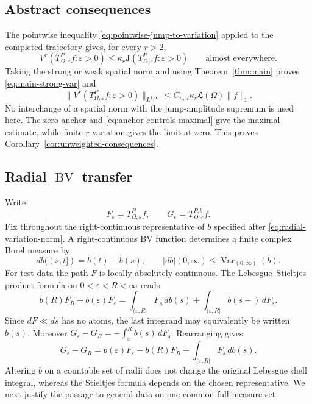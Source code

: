 \documentclass[11pt]{article}
\numberwithin{equation}{section}
\theoremstyle{remark}
\theoremstyle{definition}
\newcommand{\Var}{\operatorname{Var}}
\newcommand{\norm}[1]{\lVert #1\rVert}
\newcommand{\BV}{\operatorname{BV}}
\begin{document}
\subsection{Abstract consequences}

The pointwise inequality \eqref{eq:pointwise-jump-to-variation} applied to
the completed trajectory gives, for every $r>2$,
\[
 V^r(T^P_{\Omega,\varepsilon}f:\varepsilon>0)
 \le\kappa_r\mathbf J(T^P_{\Omega,\varepsilon}f:\varepsilon>0)
 \qquad\text{almost everywhere}.
\]
Taking the strong or weak spatial norm and using
Theorem~\ref{thm:main} proves \eqref{eq:main-strong-var} and
\begin{equation}\label{eq:unweighted-weak-var}
 \norm{V^r(T^P_{\Omega,\varepsilon}f:\varepsilon>0)}_{L^{1,\infty}}
 \le C_{n,d}\kappa_r\mathfrak L(\Omega)\norm f_1.
\end{equation}
No interchange of a spatial norm with the jump-amplitude supremum is used
here.  The zero anchor and \eqref{eq:anchor-controls-maximal} give the
maximal estimate, while finite $r$-variation gives the limit at zero.
This proves Corollary~\ref{cor:unweighted-consequences}.

\subsection{Radial \texorpdfstring{$\BV$}{BV} transfer}

Write
\[
 F_\varepsilon=T^P_{\Omega,\varepsilon}f,
 \qquad G_\varepsilon=T^{P,b}_{\Omega,\varepsilon}f.
\]
Fix throughout the right-continuous representative of $b$ specified
after \eqref{eq:radial-variation-norm}.  A right-continuous BV function
determines a finite complex Borel measure by
\[
 db((s,t])=b(t)-b(s),\qquad
 |db|(0,\infty)\le\Var_{(0,\infty)}(b).
\]
For test data the path $F$ is locally absolutely continuous.  The
Lebesgue--Stieltjes product formula on
$0<\varepsilon<R<\infty$ reads
\[
 b(R)F_R-b(\varepsilon)F_\varepsilon
 =\int_{(\varepsilon,R]}F_s\,db(s)
  +\int_{(\varepsilon,R]}b(s-)\,dF_s.
\]
Since $dF\ll ds$ has no atoms, the last integrand may equivalently be
written $b(s)$.  Moreover
$G_\varepsilon-G_R=-\int_\varepsilon^Rb(s)\,dF_s$.  Rearranging gives
\begin{equation}\label{eq:stieltjes-finite}
 G_\varepsilon-G_R
 =b(\varepsilon)F_\varepsilon-b(R)F_R
   +\int_{(\varepsilon,R]}F_s\,db(s).
\end{equation}
Altering $b$ on a countable set of radii does not change the original
Lebesgue shell integral, whereas the Stieltjes formula depends on the
chosen representative.  We next justify the passage to general data on
one common full-measure set.
\end{document}
